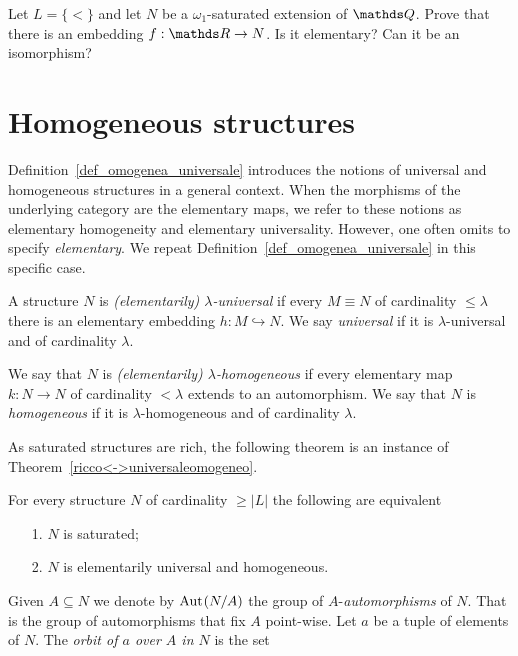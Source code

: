 \documentclass[creche.tex]{subfiles}
\begin{document}
\begin{exercise}
  Let $L = \{<\}$ and let $N$ be a $\omega_1$-saturated extension of $\QQ$. Prove that there is an embedding $f:\RR \to  N$. Is it elementary? Can it be an isomorphism?\QED
\end{exercise}

\section{Homogeneous structures}\label{homogeneous}
Definition~\ref{def_omogenea_universale} introduces the notions of universal and homogeneous structures in a general context.
When the morphisms of the underlying category are the elementary maps, we refer to these notions as elementary homogeneity and elementary universality.
However, one often omits to specify \textit{elementary}. We repeat Definition~\ref{def_omogenea_universale} in this specific case. 

\begin{definition}
A structure $N$ is \emph{(elementarily) $\lambda$-universal\/} if every $M\equiv N$ of cardinality $\le\lambda$ there is an elementary embedding $h:M\hookrightarrow N$.
We say  \emph{universal\/}  if it is $\lambda$-universal and of cardinality $\lambda$.

We say that $N$ is \emph{(elementarily) $\lambda$-homogeneous\/} if every elementary map $k:N\to N$ of cardinality $<\lambda$ extends to an automorphism. We say that $N$ is \emph{homogeneous\/} if it is $\lambda$-homogeneous and of cardinality $\lambda$.\QED
\end{definition}

As saturated structures are rich, the following theorem is an instance of Theorem~\ref{ricco<->universaleomogeneo}.

\begin{theorem}\label{thm_saturo_omogeneouniversale}
For every structure $N$ of cardinality $\ge|L|$ the following are equivalent\nobreak
\begin{itemize}
\item[1.] $N$ is saturated;
\item[2.] $N$ is elementarily universal and homogeneous.\QED
\end{itemize}
\end{theorem}

Given $A\subseteq N$ we denote by \emph{${\rm Aut\kern.15ex}(N/A)$\/} the group of \emph{$A\mbox{-}$automorphisms\/} of $N$. That is the group of automorphisms that fix $A$ point-wise.
Let $a$ be a tuple of elements of $N$. The \emph{orbit of $a$ over $A$ in $N$} is the set
\end{document}
